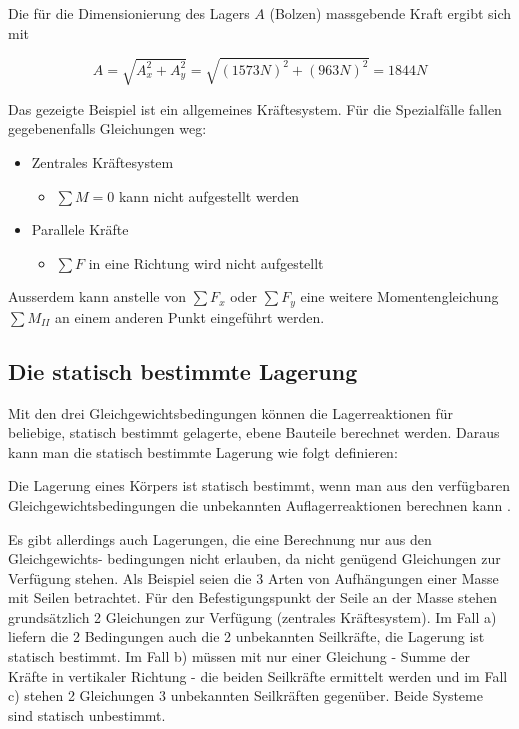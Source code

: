 \begin{bspbox}
    Die für die Dimensionierung des Lagers $A$ (Bolzen) massgebende Kraft ergibt sich mit

    \begin{equation*}
        A = \sqrt{A_x^2 + A_y^2} = \sqrt{(1573N)^2 + (963N)^2} = 1844N
    \end{equation*}

\end{bspbox}

Das gezeigte Beispiel ist ein allgemeines Kräftesystem. 
Für die Spezialfälle fallen gegebenenfalls Gleichungen weg:

\begin{itemize}
    \item Zentrales Kräftesystem
    \begin{itemize}
        \item $\sum M = 0$ kann nicht aufgestellt werden
    \end{itemize}
    \item Parallele Kräfte
    \begin{itemize}
        \item $\sum F$ in eine Richtung wird nicht aufgestellt
    \end{itemize}
\end{itemize}

Ausserdem kann anstelle von $\sum F_x$ oder $\sum F_y$ eine weitere Momentengleichung $\sum M_{II}$ an 
einem anderen Punkt eingeführt werden.

\subsection{Die statisch bestimmte Lagerung}

Mit den drei Gleichgewichtsbedingungen können die Lagerreaktionen für beliebige, statisch
bestimmt gelagerte, ebene Bauteile berechnet werden.
Daraus kann man die statisch bestimmte Lagerung wie folgt definieren:

\begin{infobox}
    Die Lagerung eines Körpers ist statisch bestimmt, wenn man aus den verfügbaren
    Gleichgewichtsbedingungen die unbekannten Auflagerreaktionen berechnen kann \cite{bartsch_mechanik_2022}.
\end{infobox}

Es gibt allerdings auch Lagerungen, die eine Berechnung nur aus den Gleichgewichts-
bedingungen nicht erlauben, da nicht genügend Gleichungen zur Verfügung stehen. Als
Beispiel seien die 3 Arten von Aufhängungen einer Masse mit Seilen betrachtet. Für den
Befestigungspunkt der Seile an der Masse stehen grundsätzlich 2 Gleichungen zur Verfügung
(zentrales Kräftesystem). Im Fall a) liefern die 2 Bedingungen auch die 2 unbekannten
Seilkräfte, die Lagerung ist statisch bestimmt.
Im Fall b) müssen mit nur einer Gleichung - Summe der Kräfte in vertikaler Richtung - die
beiden Seilkräfte ermittelt werden und im Fall c) stehen 2 Gleichungen 3 unbekannten
Seilkräften gegenüber. Beide Systeme sind statisch unbestimmt.

